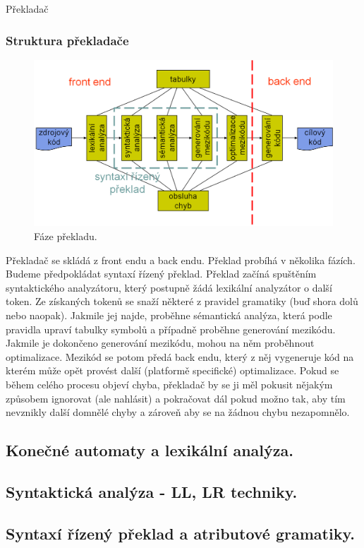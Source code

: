 \begin{definiceN}{Překladač}
\subsubsection{Struktura překladače}
\begin{figure}[h]
	\centering
	\includegraphics[width=15cm]{i2/softwarove_inzenyrstvi/obrazky/Faze_prekladu.png}
	\caption{Fáze překladu.}
	\label{pic:Prekladac-cerna_skrinka}
\end{figure}
Překladač se skládá z front endu a back endu. Překlad probíhá v několika fázích. Budeme předpokládat syntaxí řízený překlad. Překlad začíná spuštěním syntaktického analyzátoru, který postupně žádá lexikální analyzátor o další token. Ze získaných tokenů se snaží  některé z pravidel gramatiky (buď shora dolů nebo naopak). Jakmile jej najde, proběhne sémantická analýza, která podle pravidla upraví tabulky symbolů a případně proběhne generování mezikódu. Jakmile je dokončeno generování mezikódu, mohou na něm proběhnout optimalizace. Mezikód se potom předá back endu, který z něj vygeneruje kód na kterém může opět provést další (platformě specifické) optimalizace. Pokud se během celého procesu objeví chyba, překladač by se ji měl pokusit nějakým způsobem ignorovat (ale nahlásit) a pokračovat dál pokud možno tak, aby tím nevznikly další domnělé chyby a zároveň aby se na žádnou chybu nezapomnělo.




\subsection{Konečné automaty a lexikální analýza.}
\subsection{Syntaktická analýza - LL, LR techniky.}
\subsection{Syntaxí řízený překlad a atributové gramatiky.}

\end{definiceN}
